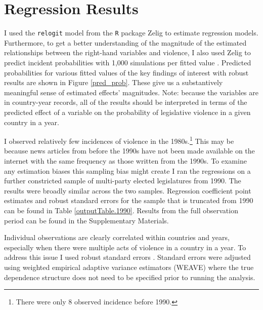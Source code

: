 \documentclass[a4paper]{article}\usepackage[]{graphicx}\usepackage[]{color}
\begin{document}
\section{Regression Results}

I used the {\tt{relogit}} model from the {\tt{R}} package Zelig \citep{IMAIKingZelig2008} to estimate regression models. Furthermore, to get a better understanding of the magnitude of the estimated relationships between the right-hand variables and violence, I also used Zelig to predict incident probabilities with 1,000 simulations per fitted value \citep[]{King2002}. Predicted probabilities for various fitted values of the key findings of interest with robust results are shown in Figure \ref{pred_prob}. These give us a substantively meaningful sense of estimated effects' magnitudes. Note: because the variables are in country-year records, all of the results should be interpreted in terms of the predicted effect of a variable on the probability of legislative violence in a given country in a year.

I observed relatively few incidences of violence in the 1980s.\footnote{There were only 8 observed incidence before 1990.} This may be because news articles from before the 1990s have not been made available on the internet with the same frequency as those written from the 1990s. To examine any estimation biases this sampling bias might create I ran the regressions on a further constricted sample of multi-party elected legislatures from 1990. The results were broadly similar across the two samples. Regression coefficient point estimates and robust standard errors for the sample that is truncated from 1990 can be found in Table \ref{outputTable.1990}. Results from the full observation period can be found in the Supplementary Materials. 

Individual observations are clearly correlated within countries and years, especially when there were multiple acts of violence in a country in a year. To address this issue I used robust standard errors \citep{Golder2006, Mainwaring2007}. Standard errors were adjusted using \cite{Lumley1999} weighted empirical adaptive variance estimators (WEAVE) where the true dependence structure does not need to be specified prior to running the analysis.

\end{document}
